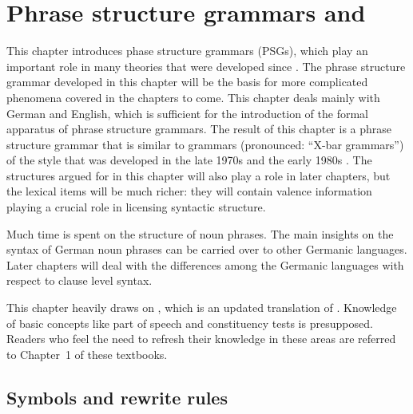 \chapter{Phrase structure grammars and \xbart}
\label{chap-psg-xbar}\label{chap-psg}

This chapter introduces phase structure grammars (PSGs), which play an important role in many
theories that were developed since . The phrase structure grammar developed in
this chapter will be the basis for more complicated phenomena covered in the chapters to come. This
chapter deals mainly with German and English, which is sufficient for the introduction of the formal apparatus
of phrase structure grammars. The result of this chapter is a phrase structure grammar that is
similar to \xbar grammars (pronounced: ``X-bar grammars'') of the style that was developed in the late 1970s and the early 1980s
\citep{Chomsky70a,Jackendoff77a}. The structures argued for in this chapter will also play a role in later
chapters, but the lexical items will be much richer: they will contain valence information playing a
crucial role in licensing syntactic structure.

Much time is spent on the structure of noun phrases. The main insights on the syntax of German noun
phrases can be carried over to other Germanic languages. Later chapters will deal with the
differences among the Germanic languages with respect to clause level syntax.

This chapter heavily draws on , which is an updated translation of
. Knowledge of basic concepts like part of speech and
constituency tests is presupposed. Readers who feel the need to refresh their knowledge in these
areas are referred to Chapter~1 of these textbooks.

\section{Symbols and rewrite rules}
\label{sec-simple-psg}

